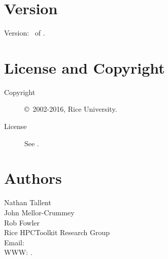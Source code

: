 \documentclass[english]{article}
\begin{document}
\section{Version}

Version: \Version\ of \Date.

\section{License and Copyright}

\begin{description}
\item[Copyright] \copyright\ 2002-2016, Rice University.
\item[License] See .
\end{description}

\section{Authors}

\noindent
Nathan Tallent \\
John Mellor-Crummey \\
Rob Fowler \\
Rice HPCToolkit Research Group \\
Email:  \\
WWW: .

\LatexManEnd
\end{document}
